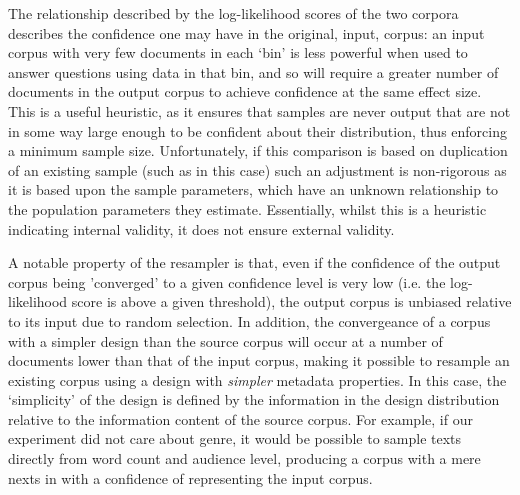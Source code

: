 













The relationship described by the log-likelihood scores of the two corpora describes the confidence one may have in the original, input, corpus: an input corpus with very few documents in each `bin' is less powerful when used to answer questions using data in that bin, and so will require a greater number of documents in the output corpus to achieve confidence at the same effect size.  This is a useful heuristic, as it ensures that samples are never output that are not in some way large enough to be confident about their distribution, thus enforcing a minimum sample size.  Unfortunately, if this comparison is based on duplication of an existing sample (such as in this case) such an adjustment is non-rigorous as it is based upon the sample parameters, which have an unknown relationship to the population parameters they estimate.  Essentially, whilst this is a heuristic indicating internal validity, it does not ensure external validity.

A notable property of the resampler is that, even if the confidence of the output corpus being 'converged' to a given confidence level is very low (i.e. the log-likelihood score is above a given threshold), the output corpus is unbiased relative to its input due to random selection.  In addition, the convergeance of a corpus with a simpler design than the source corpus will occur at a number of documents lower than that of the input corpus, making it possible to resample an existing corpus using a design with \textit{simpler} metadata properties.  In this case, the `simplicity' of the design is defined by the information in the design distribution relative to the information content of the source corpus.  For example, if our experiment did not care about genre, it would be possible to sample texts directly from word count and audience level, producing a corpus with a mere  nexts in with a  confidence of representing the input corpus.







